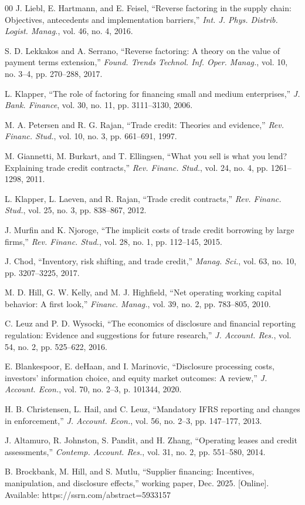 \documentclass[conference,a4paper]{IEEEtran}
\begin{document}
\begin{thebibliography}{00}
 J. Liebl, E. Hartmann, and E. Feisel, ``Reverse factoring in the supply chain: Objectives, antecedents and implementation barriers,'' \textit{Int. J. Phys. Distrib. Logist. Manag.}, vol. 46, no. 4, 2016.

 S. D. Lekkakos and A. Serrano, ``Reverse factoring: A theory on the value of payment terms extension,'' \textit{Found. Trends Technol. Inf. Oper. Manag.}, vol. 10, no. 3--4, pp. 270--288, 2017.

 L. Klapper, ``The role of factoring for financing small and medium enterprises,'' \textit{J. Bank. Finance}, vol. 30, no. 11, pp. 3111--3130, 2006.

 M. A. Petersen and R. G. Rajan, ``Trade credit: Theories and evidence,'' \textit{Rev. Financ. Stud.}, vol. 10, no. 3, pp. 661--691, 1997.

 M. Giannetti, M. Burkart, and T. Ellingsen, ``What you sell is what you lend? Explaining trade credit contracts,'' \textit{Rev. Financ. Stud.}, vol. 24, no. 4, pp. 1261--1298, 2011.

 L. Klapper, L. Laeven, and R. Rajan, ``Trade credit contracts,'' \textit{Rev. Financ. Stud.}, vol. 25, no. 3, pp. 838--867, 2012.

 J. Murfin and K. Njoroge, ``The implicit costs of trade credit borrowing by large firms,'' \textit{Rev. Financ. Stud.}, vol. 28, no. 1, pp. 112--145, 2015.

 J. Chod, ``Inventory, risk shifting, and trade credit,'' \textit{Manag. Sci.}, vol. 63, no. 10, pp. 3207--3225, 2017.

 M. D. Hill, G. W. Kelly, and M. J. Highfield, ``Net operating working capital behavior: A first look,'' \textit{Financ. Manag.}, vol. 39, no. 2, pp. 783--805, 2010.

 C. Leuz and P. D. Wysocki, ``The economics of disclosure and financial reporting regulation: Evidence and suggestions for future research,'' \textit{J. Account. Res.}, vol. 54, no. 2, pp. 525--622, 2016.

 E. Blankespoor, E. deHaan, and I. Marinovic, ``Disclosure processing costs, investors' information choice, and equity market outcomes: A review,'' \textit{J. Account. Econ.}, vol. 70, no. 2--3, p. 101344, 2020.

 H. B. Christensen, L. Hail, and C. Leuz, ``Mandatory IFRS reporting and changes in enforcement,'' \textit{J. Account. Econ.}, vol. 56, no. 2--3, pp. 147--177, 2013.

 J. Altamuro, R. Johnston, S. Pandit, and H. Zhang, ``Operating leases and credit assessments,'' \textit{Contemp. Account. Res.}, vol. 31, no. 2, pp. 551--580, 2014.

 B. Brockbank, M. Hill, and S. Mutlu, ``Supplier financing: Incentives, manipulation, and disclosure effects,'' working paper, Dec. 2025. [Online]. Available: https://ssrn.com/abstract=5933157

\end{thebibliography}
\end{document}
